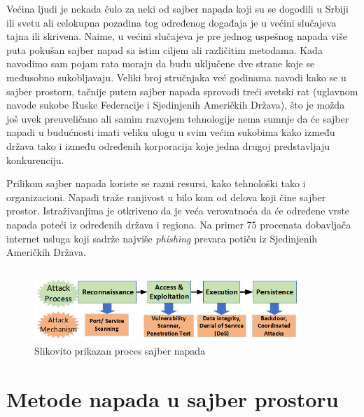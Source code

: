 \documentclass[a4paper]{article}
\begin{document}
{Većina ljudi je nekada čulo za neki od sajber napada koji su se dogodili u Srbiji ili svetu ali celokupna pozadina tog određenog događaja je u većini slučajeva tajna ili skrivena. Naime, u većini slučajeva je pre jednog uspešnog napada više puta pokušan sajber napad sa istim ciljem ali različitim metodama. Kada navodimo sam pojam rata moraju da budu uključene dve strane koje se međusobno sukobljavaju. Veliki broj stručnjaka već godinama navodi kako se u sajber prostoru, tačnije putem sajber napada sprovodi treći svetski rat (uglavnom navode sukobe Ruske Federacije i Sjedinjenih Američkih Država), što je možda još uvek preuveličano ali samim razvojem tehnologije nema sumnje da će sajber napadi u budućnosti imati veliku ulogu u svim većim sukobima kako između država tako i između određenih korporacija koje jedna drugoj predstavljaju konkurenciju.

Prilikom sajber napada koriste se razni resursi, kako tehnološki tako i organizacioni. Napadi traže ranjivost u bilo kom od delova koji čine sajber prostor. Istraživanjima je otkriveno da je veća verovatnoća da će određene vrste napada poteći iz određenih država i regiona. Na primer 75 procenata dobavljača internet usluga koji sadrže najviše \emph{phishing} prevara potiču iz Sjedinjenih Američkih Država.


\begin{verbatim}
\end{verbatim}

\begin{figure}[h!]
  \centering
  \begin{center}
  \includegraphics[width=100mm]{cyber_attack_proces.png}
  \end{center}
  \caption{Slikovito prikazan proces sajber napada}
  \label{fig:vr1}
\end{figure}

\newpage

\section{Metode napada u sajber prostoru}
\label{sec:naslov2}

}
\end{document}
